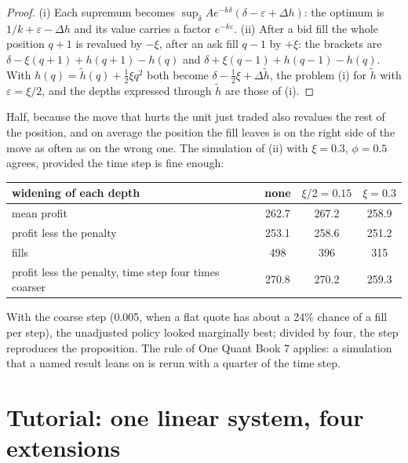 \begin{proof}
(i) Each supremum becomes $\sup_\delta Ae^{-k\delta}(\delta-\varepsilon+\Delta h)$: the optimum is $1/k+\varepsilon-\Delta h$ and its value carries a
factor $e^{-k\varepsilon}$. (ii) After a bid fill the whole position $q+1$ is revalued by $-\xi$, after an ask fill $q-1$ by $+\xi$: the brackets are
$\delta-\xi(q+1)+h(q+1)-h(q)$ and $\delta+\xi(q-1)+h(q-1)-h(q)$. With $h(q)=\tilde h(q)+\tfrac12\xi q^2$ both become $\delta-\tfrac12\xi+\Delta\tilde
h$, the problem (i) for $\tilde h$ with $\varepsilon=\xi/2$, and the depths expressed through $\tilde h$ are those of (i).
\end{proof}

Half, because the move that hurts the unit just traded also revalues the rest of the position, and on average the position the fill leaves is on the
right side of the move as often as on the wrong one. The simulation of (ii) with $\xi=0.3$, $\phi=0.5$ agrees, provided the time step is fine
enough:

\begin{center}
\small
\begin{tabular}{@{}lccc@{}}
\toprule
widening of each depth & none & $\xi/2=0.15$ & $\xi=0.3$\\
\midrule
mean profit & 262.7 & 267.2 & 258.9\\
profit less the penalty & 253.1 & 258.6 & 251.2\\
fills & 498 & 396 & 315\\
profit less the penalty, time step four times coarser & 270.8 & 270.2 & 259.3\\
\bottomrule
\end{tabular}
\end{center}

With the coarse step (0.005, when a flat quote has about a 24\% chance of a fill per step), the unadjusted policy looked marginally best; divided by four, the step
reproduces the proposition. The rule of One Quant Book 7 applies: a simulation that a named result leans on is rerun with a quarter of the time
step.

\section{Tutorial: one linear system, four extensions}\label{tut:hf:extensions-of-the-inventory-framework:tut}

